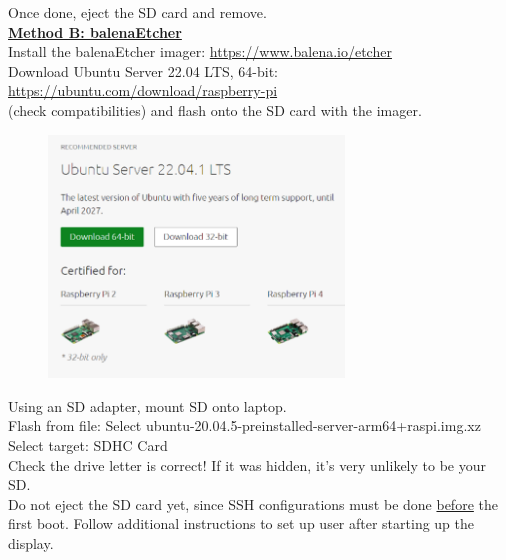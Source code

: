 \documentclass[a4paper, 10pt]{article}
\begin{document}
        Once done, eject the SD card and remove. \\ 
    
    
        \underline{\textbf{Method B: balenaEtcher}} \\
        Install the balenaEtcher imager: \url{https://www.balena.io/etcher} \\
    
        Download Ubuntu Server 22.04 LTS, 64-bit: \\ \url{https://ubuntu.com/download/raspberry-pi} \\
        (check compatibilities) and flash onto the SD card with the imager. \\
    
        \begin{figure}[h]
            \centering
            \includegraphics[width=0.7\textwidth]{media/ubuntu_server_image.png}
            \label{fig:ubuntu-server}
        \end{figure}
    
        
        Using an SD adapter, mount SD onto laptop.\\
        Flash from file: Select ubuntu-20.04.5-preinstalled-server-arm64+raspi.img.xz \\
        Select target: SDHC Card \\
        
        Check the drive letter is correct!
        If it was hidden, it’s very unlikely to be your SD. \\
        
        Do not eject the SD card yet, since SSH configurations must be done \underline{before} the first boot.
        Follow additional instructions to set up user after starting up the display. \\
        
\end{document}
